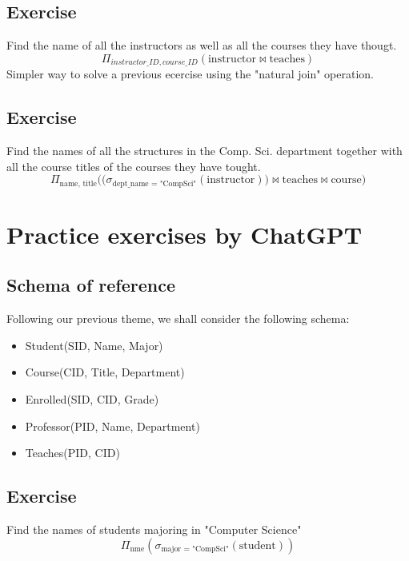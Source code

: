 \documentclass{article}
\begin{document}
\vspace{4mm}
\subsection{Exercise}
\noindent Find the name of all the instructors as well as all the courses they have thougt.
$$\Pi_{instructor\_ID, course\_ID}(\text{instructor} \Join \text{teaches}) $$
\vspace{2mm} \noindent Simpler way to solve a previous ecercise using the "natural join" operation.

\vspace{4mm}
\subsection{Exercise}
\noindent Find the names of all the structures in the Comp. Sci. department
together with all the course titles of the courses they have tought.
$$
\Pi_{\text{name, title}}\Big(
    \big(\sigma_{\text{dept\_name = "CompSci"}}(\text{instructor})\big)
    \Join \text{teaches} \Join \text{course}
\Big)
$$

\newpage
\section{Practice exercises by ChatGPT}
\subsection{Schema of reference}
\noindent Following our previous theme, we shall consider the following schema:
\begin{itemize}
    \item Student(SID, Name, Major)
    \item Course(CID, Title, Department)  
    \item Enrolled(SID, CID, Grade)
    \item Professor(PID, Name, Department)
    \item Teaches(PID, CID)
\end{itemize}

\vspace{4mm}
\subsection{Exercise}
\noindent Find the names of students majoring in "Computer Science"
$$ \Pi_{\text{nme}}\left(
    \sigma_{\text{major = "CompSci"}}(
        \text{student})
\right)$$
\end{document}
